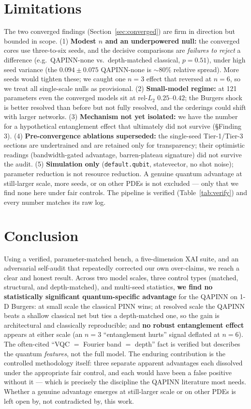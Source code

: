 \documentclass[11pt]{article}
\begin{document}
\section{Limitations}
The two converged findings (Section~\ref{sec:converged}) are firm in direction but
bounded in scope. (1) \textbf{Modest $n$ and an underpowered null:} the converged
cores use three-to-six seeds, and the decisive comparisons are \emph{failures to
reject} a difference (e.g.\ QAPINN-none vs.\ depth-matched classical, $p=0.51$),
under high seed variance (the $0.094\pm0.075$ QAPINN-none is $\sim$80\% relative
spread). More seeds would tighten these; we caught one $n=3$ effect that reversed at
$n=6$, so we treat all single-scale nulls as provisional. (2) \textbf{Small-model
regime:} at 121 parameters even the converged models sit at rel-$L_2$ $0.25$--$0.42$;
the Burgers shock is
better resolved than before but not fully resolved, and the orderings could shift
with larger networks. (3) \textbf{Mechanism not yet isolated:} we have the number
for a hypothetical entanglement effect that ultimately did not survive (§Finding 3).
(4) \textbf{Pre-convergence ablations superseded:} the single-seed Tier-1/Tier-3
sections are undertrained and are retained only for transparency; their optimistic
readings (bandwidth-gated advantage, barren-plateau signature) did not survive the
audit. (5) \textbf{Simulation only} (\texttt{default.qubit}, statevector, no shot
noise); parameter reduction is not resource reduction. A genuine quantum advantage
at still-larger scale, more seeds, or on other PDEs is not excluded --- only that we
find none here under fair controls. The pipeline is verified
(Table~\ref{tab:verify}) and every number matches its raw log.

\section{Conclusion}
Using a verified, parameter-matched bench, a five-dimension XAI suite, and an
adversarial self-audit that repeatedly corrected our own over-claims, we reach a
clear and honest result. Across two model scales, three control types (matched,
structural, and depth-matched), and multi-seed statistics, \textbf{we find no
statistically significant quantum-specific advantage} for the QAPINN on 1-D Burgers:
at small scale the classical PINN wins; at resolved scale the QAPINN beats a shallow
classical net but ties a depth-matched one, so the gain is architectural and
classically reproducible; and \textbf{no robust entanglement effect} appears at
either scale (an $n=3$ ``entanglement hurts'' signal deflated at $n=6$). The
often-cited ``VQC $=$ Fourier band $=$ depth'' fact is verified but describes the
quantum \emph{features}, not the full model. The enduring contribution is the
controlled methodology itself: three separate apparent advantages each dissolved
under the appropriate fair control, and each would have been a false positive without
it --- which is precisely the discipline the QAPINN literature most needs. Whether a
genuine advantage emerges at still-larger scale or on other PDEs is left open by, not
contradicted by, this work.
\end{document}
